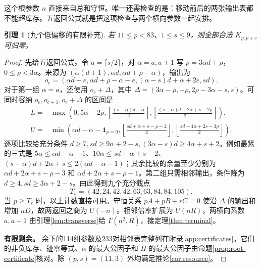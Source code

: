\documentclass[11pt,a4paper,oneside,openany]{book}
\newtheorem{lemma}[theorem]{引理}
\theoremstyle{definition}
\numberwithin{equation}{chapter}
\begin{document}
这个根参数 $n$ 直接来自总和守恒。唯一还需检查的是：移动前后的两张输出表都不能超库存。五返回公式就是把这项检查与两个横向参数一起安排。
\begin{lemma}[九个低偏移的有限补充]\label{lem:small-supply}
若 $11\le p<83$、$1\le s\le9$，则全部合法 $K_{p,p+s}$ 可归零。
\end{lemma}
\begin{proof}
先给五返回公式。令 $a=\lceil s/2\rceil$，对 $\alpha=a,a+1$ 写 $p=3\alpha d+\rho$，$0\le\rho<3\alpha$。来源为 $(\alpha(d+1),\alpha d,\alpha d+\rho-\alpha)$，输出为
\[
o_e=(\alpha d-e,\alpha d+\rho-\alpha-e,(\alpha-s)d+\alpha+2e,sd).
\]
对于第一组 $\alpha=a$，还使用 $o_e+\Delta$，其中 $\Delta=(3\alpha-\rho,-\rho,2\rho-3\alpha-s,s)$。可同时容纳 $o_e,o_{e+1},o_e+\Delta$ 的区间是
\begin{align*}
L={}&\max\left(0,5\alpha-2\rho,
\left\lceil\frac{(s-\alpha)d-\alpha}{2}\right\rceil,
\left\lceil\frac{(s-\alpha)d+2\alpha+s-2\rho}{2}\right\rceil\right),\\
U={}&\min\left(\alpha d-\alpha-\mathbf1_{\rho=0},
\left\lfloor\frac{sd+\alpha+s-\rho-2}{2}\right\rfloor,
\left\lfloor\frac{sd+4\alpha+2s-3\rho}{2}\right\rfloor\right).
\end{align*}
逐项比较给充分条件 $d\ge7,sd\ge9\alpha+2-s,(3\alpha-s)d\ge4\alpha+s+2$。例如最紧的三式是 $5\alpha\le\alpha d-\alpha-1$、$10\alpha\le sd+\alpha+s-2$、$(s-\alpha)d+2\alpha+s\le2(\alpha d-\alpha-1)$；其余比较的余量至少分别为 $\alpha d+2\alpha+s-\rho-3$ 和 $\alpha d+2\alpha+s-\rho-1$。第二组只需相邻输出，条件降为 $d\ge4,sd\ge3\alpha+2-s$。由此得到九个充分截点
\[
T_s=(42,24,42,42,63,63,84,84,105).
\]
当 $p\ge T_s$ 时，以上计数直接可用。守恒关系 $pA+pB+rC=0$ 使沿 $\Delta$ 的输出和增加 $nD$，故两返回之商为 $U(-n)$。相邻倍率扩展为 $U(nR)$，两横向系数 $a,a+1$ 由引理\ref{lem:transverse}给 $\Gamma(n^2,R)$，接定理\ref{thm:terminal}。


\par\noindent\textbf{有限剩余。}
余下的114组参数及233对相邻表完整列在附录\ref{app:certificates}。它们的非负库存、迹零等式、$\alpha$ 的最大公因子和 $H$ 的最大公因子由命题\ref{prop:root-certificate}核对。除 $(p,s)=(11,3)$ 外均满足推论\ref{cor:resource}。


\end{proof}
\end{document}
